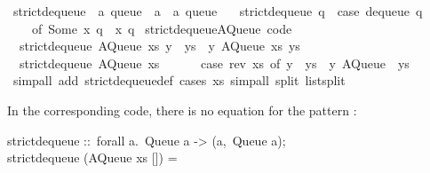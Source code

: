 \begin{isabellebody}
\ strict{\isacharunderscore}dequeue\ {\isacharcolon}{\isacharcolon}\ {\isachardoublequoteopen}{\isacharprime}a\ queue\ {\isasymRightarrow}\ {\isacharprime}a\ {\isasymtimes}\ {\isacharprime}a\ queue{\isachardoublequoteclose}\ \isanewline
\ \ {\isachardoublequoteopen}strict{\isacharunderscore}dequeue\ q\ {\isacharequal}\ {\isacharparenleft}case\ dequeue\ q\isanewline
\ \ \ \ of\ {\isacharparenleft}Some\ x{\isacharcomma}\ q{\isacharprime}{\isacharparenright}\ {\isasymRightarrow}\ {\isacharparenleft}x{\isacharcomma}\ q{\isacharprime}{\isacharparenright}{\isacharparenright}{\isachardoublequoteclose}\isanewline
\isanewline
{}\isamarkupfalse%
\ strict{\isacharunderscore}dequeue{\isacharunderscore}AQueue\ {\isacharbrackleft}code{\isacharbrackright}{\isacharcolon}\isanewline
\ \ {\isachardoublequoteopen}strict{\isacharunderscore}dequeue\ {\isacharparenleft}AQueue\ xs\ {\isacharparenleft}y\ {\isacharhash}\ ys{\isacharparenright}{\isacharparenright}\ {\isacharequal}\ {\isacharparenleft}y{\isacharcomma}\ AQueue\ xs\ ys{\isacharparenright}{\isachardoublequoteclose}\isanewline
\ \ {\isachardoublequoteopen}strict{\isacharunderscore}dequeue\ {\isacharparenleft}AQueue\ xs\ {\isacharbrackleft}{\isacharbrackright}{\isacharparenright}\ {\isacharequal}\isanewline
\ \ \ \ {\isacharparenleft}case\ rev\ xs\ of\ y\ {\isacharhash}\ ys\ {\isasymRightarrow}\ {\isacharparenleft}y{\isacharcomma}\ AQueue\ {\isacharbrackleft}{\isacharbrackright}\ ys{\isacharparenright}{\isacharparenright}{\isachardoublequoteclose}\isanewline
\ \ \isamarkupfalse%
\ {\isacharparenleft}simp{\isacharunderscore}all\ add{\isacharcolon}\ strict{\isacharunderscore}dequeue{\isacharunderscore}def{\isacharparenright}\ {\isacharparenleft}cases\ xs{\isacharcomma}\ simp{\isacharunderscore}all\ split{\isacharcolon}\ list{\isachardot}split{\isacharparenright}%
\endisatagquote
{\isafoldquote}%
%
\isadelimquote
%
\endisadelimquote
%
\begin{isamarkuptext}%
\noindent In the corresponding code, there is no equation
  for the pattern :%
\end{isamarkuptext}%
\isamarkuptrue%
%
\isadelimquote
%
\endisadelimquote
%
\isatagquote
%
\begin{isamarkuptext}%
\isatypewriter%
\noindent%
\hspace*{0pt}strict{}dequeue ::~forall a.~Queue a -> (a,~Queue a);\\
\hspace*{0pt}strict{}dequeue (AQueue xs []) =\\

\end{isamarkuptext}
\end{isabellebody}
